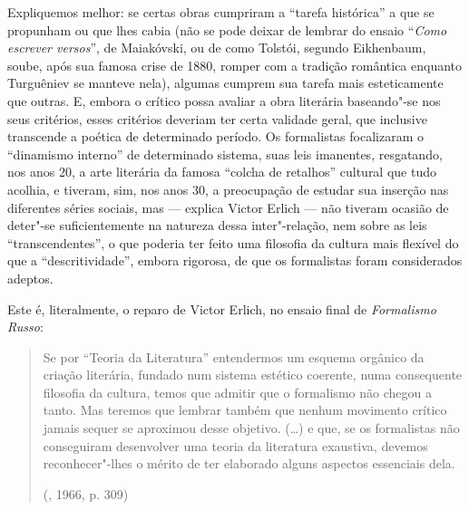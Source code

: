 {{{Expliquemos melhor: se certas obras cumpriram a
``tarefa histórica'' a que se propunham ou que lhes cabia (não se pode deixar de lembrar do ensaio ``\emph{Como escrever versos}'', de
Maiakóvski, ou de como Tolstói, segundo Eikhenbaum, soube, após sua
famosa crise de 1880, romper com a tradição romântica enquanto
Turguêniev se manteve nela), algumas cumprem sua tarefa mais
esteticamente que outras. E, embora o crítico possa avaliar a obra
literária baseando"-se nos seus critérios, esses critérios deveriam ter
certa validade geral, que inclusive transcende a poética de determinado
período. Os formalistas focalizaram o ``dinamismo interno'' de determinado sistema, suas leis imanentes, resgatando, nos anos 20, a
arte literária da famosa ``colcha de retalhos'' cultural que tudo
acolhia, e tiveram, sim, nos anos 30, a preocupação de estudar sua
inserção nas diferentes séries sociais, mas --- explica Victor Erlich ---
não tiveram ocasião de deter"-se suficientemente na natureza dessa
inter"-relação, nem sobre as leis ``transcendentes'', o que poderia
ter feito uma filosofia da cultura mais flexível do que a
``descritividade'', embora rigorosa, de que os formalistas foram considerados
adeptos.

Este é, literalmente, o reparo de Victor Erlich, no ensaio final de
\emph{Formalismo Russo}:

\begin{quote}
Se por ``Teoria da Literatura'' entendermos um esquema orgânico da
criação literária, fundado num sistema estético coerente, numa
consequente filosofia da cultura, temos que admitir que o formalismo não
chegou a tanto. Mas teremos que lembrar também que nenhum movimento
crítico jamais sequer se aproximou desse objetivo. (\ldots{}) e que, se os
formalistas não conseguiram desenvolver uma teoria da literatura
exaustiva, devemos reconhecer"-lhes o mérito de ter elaborado alguns
aspectos essenciais dela. 

(, 1966, p. 309)
\end{quote}

}}}
